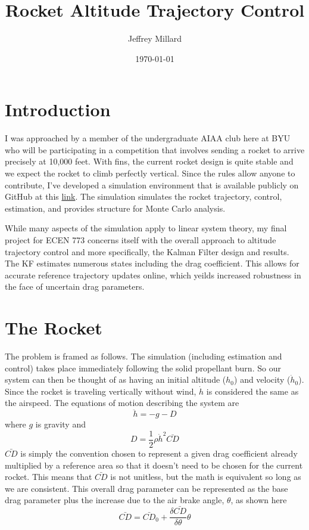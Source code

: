 \documentclass{article}
\title{Rocket Altitude Trajectory Control}
\date{\today}
\author{Jeffrey Millard}
\begin{document}
\maketitle


\section{Introduction}
  I was approached by a member of the undergraduate AIAA club here at BYU who will be participating in a competition that involves sending a rocket to arrive precisely at 10,000 feet. With fins, the current rocket design is quite stable and we expect the rocket to climb perfectly vertical. Since the rules allow anyone to contribute, I've developed a simulation environment that is available publicly on GitHub at this \href{http://www.texample.net/tikz/resources/}{link}. The simulation simulates the rocket trajectory, control, estimation, and provides structure for Monte Carlo analysis.

  While many aspects of the simulation apply to linear system theory, my final project for ECEN 773 concerns itself with the overall approach to altitude trajectory control and more specifically, the Kalman Filter design and results. The KF estimates numerous states including the drag coefficient. This allows for accurate reference trajectory updates online, which yeilds increased robustness in the face of uncertain drag parameters.

\section{The Rocket}
  The problem is framed as follows. The simulation (including estimation and control) takes place immediately following the solid propellant burn. So our system can then be thought of as having an initial altitude ($h_0$) and velocity ($\dot{h}_0$). Since the rocket is traveling vertically without wind, $\dot{h}$ is considered the same as the airspeed. The equations of motion describing the system are
  \begin{equation}
    \ddot{h} = -g -D
  \end{equation}
  where $g$ is gravity and
  \begin{equation}
    D = \frac{1}{2} \rho \dot{h}^2 \bar{CD}
  \end{equation}
  $\bar{CD}$ is simply the convention chosen to represent a given drag coefficient already multiplied by a reference area so that it doesn't need to be chosen for the current rocket. This means that $\bar{CD}$ is not unitless, but the math is equivalent so long as we are consistent. This overall drag parameter can be represented as the base drag parameter plus the increase due to the air brake angle, $\theta$, as shown here
  \begin{equation}
    \bar{CD} = \bar{CD}_0 + \frac{\delta\bar{CD}}{\delta\theta} \theta
  \end{equation}
\end{document}
